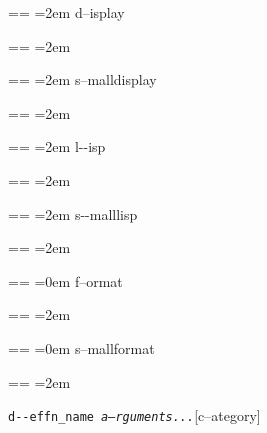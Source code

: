 \documentclass{book}
\makeatletter
\newenvironment{GNUTexinfopreformatted}{%
  \par\obeylines\obeyspaces\frenchspacing
  \parskip=\z@\parindent=\z@}{}
\makeatother
\begin{document}
\begin{GNUTexinfopreformatted}
\leftskip=2em\relax%
d--isplay
\end{GNUTexinfopreformatted}
\begin{GNUTexinfopreformatted}
\leftskip=2em\relax\ttfamily%

\end{GNUTexinfopreformatted}
\begin{GNUTexinfopreformatted}
\leftskip=2em\relax\footnotesize%
s--malldisplay
\end{GNUTexinfopreformatted}
\begin{GNUTexinfopreformatted}
\leftskip=2em\relax\ttfamily%

\end{GNUTexinfopreformatted}
\begin{GNUTexinfopreformatted}
\leftskip=2em\relax\ttfamily%
l{-}{-}isp
\end{GNUTexinfopreformatted}
\begin{GNUTexinfopreformatted}
\leftskip=2em\relax\ttfamily%

\end{GNUTexinfopreformatted}
\begin{GNUTexinfopreformatted}
\leftskip=2em\relax\ttfamily\footnotesize%
s{-}{-}malllisp
\end{GNUTexinfopreformatted}
\begin{GNUTexinfopreformatted}
\leftskip=2em\relax\ttfamily%

\end{GNUTexinfopreformatted}
\begin{GNUTexinfopreformatted}
\leftskip=0em\relax%
f--ormat
\end{GNUTexinfopreformatted}
\begin{GNUTexinfopreformatted}
\leftskip=2em\relax\ttfamily%

\end{GNUTexinfopreformatted}
\begin{GNUTexinfopreformatted}
\leftskip=0em\relax\footnotesize%
s--mallformat
\end{GNUTexinfopreformatted}
\begin{GNUTexinfopreformatted}
\leftskip=2em\relax\ttfamily%

\end{GNUTexinfopreformatted}
\noindent\texttt{d{-}{-}effn\_name \EmbracOn{}\textnormal{\textsl{a--rguments...}}\EmbracOff{}}\hfill[c--ategory]
\end{document}

